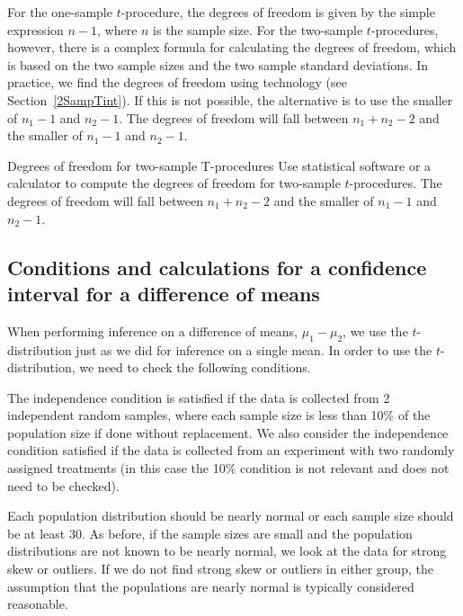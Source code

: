 \D{\newpage}

For the one-sample $t$-procedure, the degrees of freedom is given by the simple expression $n-1$, where $n$ is the sample size.  For the two-sample $t$-procedures, however, there is a complex formula for calculating the degrees of freedom, which is based on the two sample sizes and the two sample standard deviations.  In practice, we find the degrees of freedom using technology (see Section~\ref{2SampTint}).  If this is not possible, the alternative is to use the smaller of $n_1-1$ and $n_2-1$.  The degrees of freedom will fall between $n_1+n_2-2$ and the smaller of $n_1-1$ and $n_2-1$.

\begin{onebox}
{Degrees of freedom for two-sample T-procedures}
Use statistical software or a calculator to compute the degrees of freedom for two-sample \mbox{$t$-procedures}.  The degrees of freedom will fall between $n_1+n_2-2$ and the smaller of $n_1-1$ and $n_2-1$. 
\end{onebox}

\subsection{Conditions and calculations for a confidence interval for a difference of means}
When performing inference on a difference of means, $\mu_1-\mu_2$, we use the $t$-distribution just as we did for inference on a single mean.  In order to use the $t$-distribution, we need to check the following conditions.
\begin{description}
\setlength{\itemsep}{0mm}
\item[Independence.]
  The independence condition is satisfied if the data is collected from 2 independent random samples, where each sample size is less than 10\% of the population size if done without replacement.  We also consider the independence condition satisfied if the data is collected from an experiment with two randomly assigned treatments (in this case the 10\% condition is not relevant and does not need to be checked).
\item[Large sample / normal population.]
  Each population distribution should be nearly normal
  or each sample size should be at least 30.
  As before, if the sample sizes are small and the population
  distributions are not known to be nearly normal,
  we look at the data for strong skew or outliers.
  If we do not find strong skew or outliers in either group,
  the assumption that the populations are nearly normal is typically considered reasonable.
\end{description}




